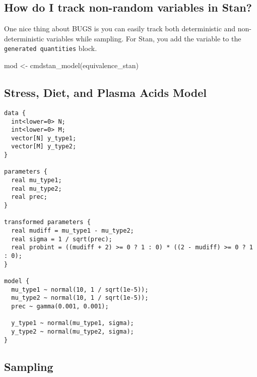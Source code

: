 \documentclass[
  letterpaper,
  DIV=11,
  numbers=noendperiod]{scrreprt}
\newenvironment{Shaded}{\begin{snugshade}}{\end{snugshade}}
\newcommand{\FunctionTok}[1]{\textcolor[rgb]{0.28,0.35,0.67}{#1}}
\newcommand{\NormalTok}[1]{\textcolor[rgb]{0.00,0.23,0.31}{#1}}
\newcommand{\OtherTok}[1]{\textcolor[rgb]{0.00,0.23,0.31}{#1}}
\begin{document}
\hypertarget{how-do-i-track-non-random-variables-in-stan-1}{%
\subsection*{How do I track non-random variables in
Stan?}\label{how-do-i-track-non-random-variables-in-stan-1}}

One nice thing about BUGS is you can easily track both deterministic and
non-deterministic variables while sampling. For Stan, you add the
variable to the \texttt{generated\ quantities} block.

\begin{Shaded}
\begin{Highlighting}[]
\NormalTok{mod }\OtherTok{\textless{}{-}} \FunctionTok{cmdstan\_model}\NormalTok{(equivalence\_stan)}
\end{Highlighting}
\end{Shaded}

\hypertarget{stress-diet-and-plasma-acids-model-1}{%
\subsection*{Stress, Diet, and Plasma Acids
Model}\label{stress-diet-and-plasma-acids-model-1}}

\begin{verbatim}
data {
  int<lower=0> N;
  int<lower=0> M;
  vector[N] y_type1;
  vector[M] y_type2;
}

parameters {
  real mu_type1;
  real mu_type2;
  real prec;
}

transformed parameters {
  real mudiff = mu_type1 - mu_type2;
  real sigma = 1 / sqrt(prec);
  real probint = ((mudiff + 2) >= 0 ? 1 : 0) * ((2 - mudiff) >= 0 ? 1 : 0);
}

model {
  mu_type1 ~ normal(10, 1 / sqrt(1e-5));
  mu_type2 ~ normal(10, 1 / sqrt(1e-5));
  prec ~ gamma(0.001, 0.001);
  
  y_type1 ~ normal(mu_type1, sigma);
  y_type2 ~ normal(mu_type2, sigma);
}
\end{verbatim}

\hypertarget{sampling-2}{%
\subsection*{Sampling}\label{sampling-2}}
\end{document}
